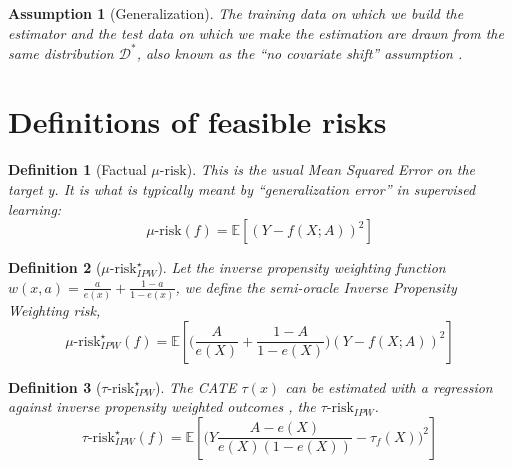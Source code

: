 \documentclass[unnumsec,webpdf,contemporary,large]{oup-authoring-template}%
\theoremstyle{thmstyleone}%
\theoremstyle{thmstyletwo}%
\theoremstyle{thmstylethree}%
\newtheorem{definition}{Definition}
\newtheorem{assumption}{Assumption}
\begin{document}
\begin{appendices}
    \begin{assumption}[Generalization]\label{assumption:generalization} The training
        data on which we build the estimator and the test data on which we make the
        estimation are drawn from the same distribution $\mathcal D^*$, also known as
        the ``no covariate shift'' assumption \cite{jesson_identifying_2020}.
    \end{assumption}

    \section{Definitions of feasible risks}\label{def:feasible_risks}


    \begin{definition}[Factual $\mu\text{-risk}$]\label{def:mu_risk}
        \cite{shalit_estimating_2017} This is the usual Mean Squared Error on
        the target y. It is what is typically meant by ``generalization error'' in
        supervised learning:
        \begin{equation*}\label{eq:mu_risk}
            \mu\text{-risk}(f)=\mathbb{E}\left[(Y-f(X ; A))^2 \right]
        \end{equation*}
    \end{definition}


    \begin{definition}[$\mu\text{-risk}_{IPW}^{\star}$]\label{def:mu_ipw_risk}
        \cite{vanderlaan_unified_2003} Let the inverse propensity weighting
        function $w(x, a) = \frac{a}{e(x)} + \frac{1 - a}{1 - e(x)}$, we define the
        semi-oracle Inverse Propensity Weighting risk,
        \begin{equation*}\label{eq:mu_ipw_risk}
            \mu\text{-risk}_{IPW}^{\star}(f) = \mathbb{E}\left[ \Big( \frac{A}{e(X)} + \frac{1-A}{1-e(X)} \Big) (Y-f(X ; A))^2 \right]
        \end{equation*}
    \end{definition}

    \smallskip


    \begin{definition}[$\tau\text{-risk}^{\star}_{IPW}$]\label{def:tau_ipw_risk}
        \cite{wager_estimation_2018}
        The CATE $\tau(x)$ can be estimated with a
        regression against inverse propensity weighted outcomes \cite{
            athey2016recursive,gutierrez_causal_2016,wager_estimation_2018},
        the $\tau\text{-risk}_{IPW}$.
        \begin{equation*}
            \tau\text{-risk}^{\star}_{IPW}(f) =\mathbb{E}
            \left[ \Big(Y \frac{A - e(X)}{e(X)
                    (1-e(X))}-\tau_f\left(X\right)\Big)^2 \right]
        \end{equation*}
    \end{definition}


\end{appendices}
\end{document}

